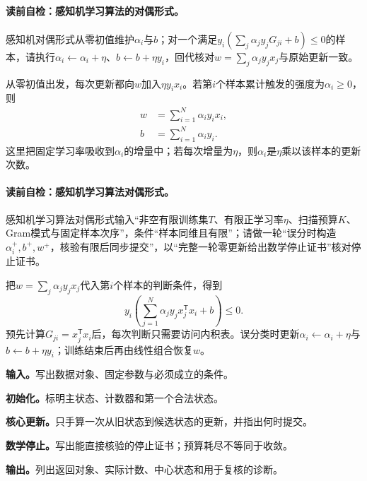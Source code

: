 \paragraph{读前自检：感知机学习算法的对偶形式。}感知机对偶形式从零初值维护$\alpha_i$与$b$；对一个满足$y_i(\sum_j\alpha_jy_jG_{ji}+b)\le0$的样本，请执行$\alpha_i\leftarrow\alpha_i+\eta$、$b\leftarrow b+\eta y_i$，回代核对$w=\sum_j\alpha_jy_jx_j$与原始更新一致。\par

从零初值出发，每次更新都向$w$加入$\eta y_i x_i$。若第$i$个样本累计触发的强度为$\alpha_i\ge0$，则
\[
\begin{aligned}
w&=\sum_{i=1}^{N}\alpha_i y_i x_i,\\
b&=\sum_{i=1}^{N}\alpha_i y_i.
\end{aligned}
\]
这里把固定学习率吸收到$\alpha_i$的增量中；若每次增量为$\eta$，则$\alpha_i$是$\eta$乘以该样本的更新次数。

\paragraph{读前自检：感知机学习算法对偶形式。}感知机学习算法对偶形式输入“非空有限训练集$T$、有限正学习率$\eta$、扫描预算$K$、Gram模式与固定样本次序”，条件“样本同维且有限”；请做一轮“误分时构造$\alpha_i^+,b^+,w^+$，核验有限后同步提交”，以“完整一轮零更新给出数学停止证书”核对停止证书。\par

把$w=\sum_j\alpha_jy_jx_j$代入第$i$个样本的判断条件，得到
\[
y_i\left(\sum_{j=1}^{N}\alpha_j y_j x_j^{\mathsf T}x_i+b\right)\le0.
\]
预先计算$G_{ji}=x_j^{\mathsf T}x_i$后，每次判断只需要访问内积表。误分类时更新$\alpha_i\leftarrow\alpha_i+\eta$与$b\leftarrow b+\eta y_i$；训练结束后再由线性组合恢复$w$。

\begin{keypointbox}[title={感知机学习算法的对偶形式：五步阅读}]
\textbf{输入。}写出数据对象、固定参数与必须成立的条件。\par
\textbf{初始化。}标明主状态、计数器和第一个合法状态。\par
\textbf{核心更新。}只手算一次从旧状态到候选状态的更新，并指出何时提交。\par
\textbf{数学停止。}写出能直接核验的停止证书；预算耗尽不等同于收敛。\par
\textbf{输出。}列出返回对象、实际计数、中心状态和用于复核的诊断。
\end{keypointbox}

